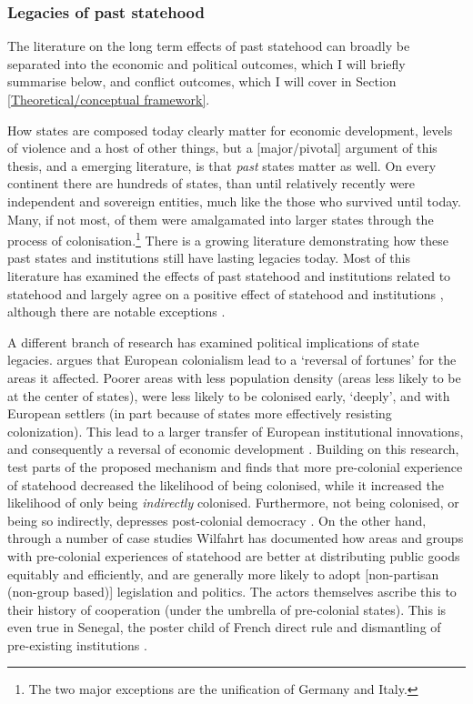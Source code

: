 \documentclass[12pt]{article}
\begin{document}
\subsubsection{Legacies of past statehood} \label{Legacies} 

The literature on the long term effects of past statehood can broadly be
separated into the economic and political outcomes, which I will briefly
summarise below, and conflict outcomes, which I will cover in Section
\ref{Theoretical/conceptual framework}.

How states are composed today clearly matter for economic development, levels of
violence and a host of other things, but a [major/pivotal] argument of this
thesis, and a emerging literature, is that \textit{past} states matter as well.
On every continent there are hundreds of states, than until relatively recently
were independent and sovereign entities, much like the those who survived until
today. Many, if not most, of them were amalgamated into larger states through
the process of colonisation.\footnote{The two major exceptions are the
unification of Germany and Italy.} There is a growing literature demonstrating
how these past states and institutions still have lasting legacies today. Most
of this literature has examined the effects of past statehood
\citep{Bockstette2002, Borcan2018} and institutions related to statehood
\citep{Michalopoulos2013, Michalopoulos2018, Englebert2000} and largely agree on
a positive effect of statehood and institutions \citep{Nunn_2020,
Michalopoulos2016}, although there are notable exceptions \citep{Acemoglu_2002}.

A different branch of research has examined political implications of
state legacies. \citet{Acemoglu_2002} argues that European colonialism lead to a
`reversal  of fortunes' for the areas it affected. Poorer areas with less
population density (areas less likely to be at the center of states), were less
likely to be colonised early, `deeply', and with European settlers (in part
because of states more effectively resisting colonization). This lead to a
larger transfer of European institutional innovations, and consequently a
reversal of economic development \citep{Acemoglu_2002}. Building on this
research, \citet{Hariri2012} test parts of the proposed mechanism and finds that
more pre-colonial experience of statehood decreased the likelihood of being
colonised, while it increased the likelihood of only being \textit{indirectly}
colonised. Furthermore, not being colonised, or being so indirectly, depresses
post-colonial democracy \citep{Hariri2012}. On the other hand, through a number
of case studies Wilfahrt \citeyear{Wilfahrt2018, Wilfahrt_2021} has documented
how areas and groups with pre-colonial experiences of statehood are better at
distributing public goods equitably and efficiently, and are generally more
likely to adopt [non-partisan (non-group based)] legislation and politics. The
actors themselves ascribe this to their history of cooperation (under the
umbrella of pre-colonial states). This is even true in Senegal, the poster child
of French direct rule and dismantling of pre-existing institutions
\citep{Wilfahrt_2021}.
\end{document}
